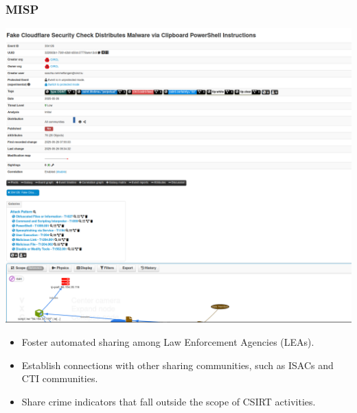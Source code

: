 \begin{frame}
    \frametitle{MISP}
    \begin{minipage}{0.45\textwidth} %
        \includegraphics[scale=0.10]{img/misp-scaled.png}
    \end{minipage}%
    \hfill
    \begin{minipage}{0.45\textwidth} %
        \begin{itemize}
            \item Foster automated sharing among Law Enforcement Agencies (LEAs).
            \item Establish connections with other sharing communities, such as ISACs and CTI communities.
            \item Share crime indicators that fall outside the scope of CSIRT activities.
        \end{itemize}
    \end{minipage}
\end{frame}

